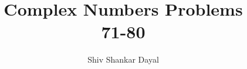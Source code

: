 \documentclass[aspectratio=169,8pt]{beamer}
\title{Complex Numbers Problems\\ 71-80}
\author[Shiv Shankar Dayal]{Shiv Shankar Dayal}
\begin{document}
\begin{frame}
  \titlepage
\end{frame}
\end{document}
